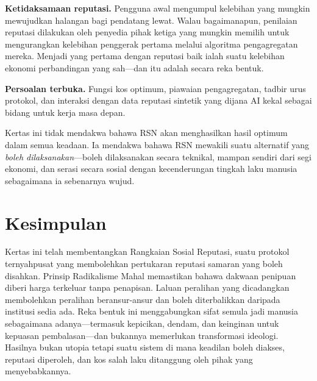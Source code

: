 \documentclass[11pt,a4paper,twocolumn]{article}
\begin{document}
\textbf{Ketidaksamaan reputasi.} Pengguna awal mengumpul kelebihan yang mungkin mewujudkan halangan bagi pendatang lewat. Walau bagaimanapun, penilaian reputasi dilakukan oleh penyedia pihak ketiga yang mungkin memilih untuk mengurangkan kelebihan penggerak pertama melalui algoritma pengagregatan mereka. Menjadi yang pertama dengan reputasi baik ialah suatu kelebihan ekonomi perbandingan yang sah---dan itu adalah secara reka bentuk.

\textbf{Persoalan terbuka.} Fungsi kos optimum, piawaian pengagregatan, tadbir urus protokol, dan interaksi dengan data reputasi sintetik yang dijana AI kekal sebagai bidang untuk kerja masa depan.

Kertas ini tidak mendakwa bahawa RSN akan menghasilkan hasil optimum dalam semua keadaan. Ia mendakwa bahawa RSN mewakili suatu alternatif yang \emph{boleh dilaksanakan}---boleh dilaksanakan secara teknikal, mampan sendiri dari segi ekonomi, dan serasi secara sosial dengan kecenderungan tingkah laku manusia sebagaimana ia sebenarnya wujud.

\section{Kesimpulan}

Kertas ini telah membentangkan Rangkaian Sosial Reputasi, suatu protokol ternyahpusat yang membolehkan pertukaran reputasi samaran yang boleh disahkan. Prinsip Radikalisme Mahal memastikan bahawa dakwaan penipuan diberi harga terkeluar tanpa penapisan. Laluan peralihan yang dicadangkan membolehkan peralihan beransur-ansur dan boleh diterbalikkan daripada institusi sedia ada. Reka bentuk ini menggabungkan sifat semula jadi manusia sebagaimana adanya---termasuk kepicikan, dendam, dan keinginan untuk kepuasan pembalasan---dan bukannya memerlukan transformasi ideologi. Hasilnya bukan utopia tetapi suatu sistem di mana keadilan boleh diakses, reputasi diperoleh, dan kos salah laku ditanggung oleh pihak yang menyebabkannya.


\end{document}
